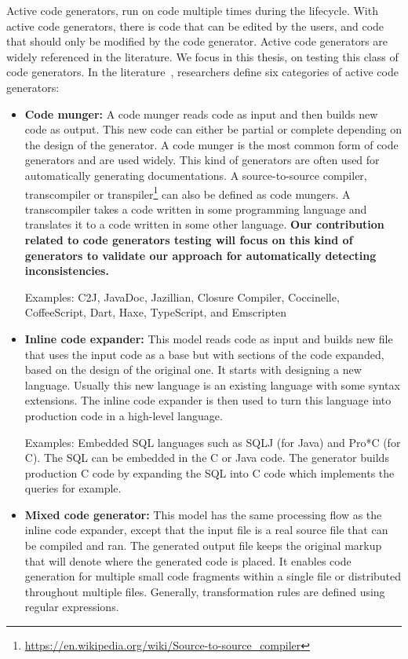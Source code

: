 Active code generators, run on code multiple times during the lifecycle. With active code generators, there is code that can be edited by the users, and code that should only be modified by the code generator. Active code generators are widely referenced in the literature\cite{pais2005tool,amanquah2009rapid}. We focus in this thesis, on testing this class of code generators.
In the literature~\cite{herrington2003code,hunt2000pragmatic,fertalj2008source,bajovs2013code}, researchers define six categories of active code generators: 

\begin{itemize}
\item \textbf{Code munger:} A code munger reads code as input and then builds new code as output. This new code can either be partial or complete depending on the design of the generator.
A code munger is the most common form of code generators and are used widely. This kind of generators are often used for automatically generating documentations.
A source-to-source compiler, transcompiler or transpiler\footnote{\url{https://en.wikipedia.org/wiki/Source-to-source_compiler}} can also be defined as code mungers. A transcompiler takes a code written in some programming language and translates it to a code written in some other language. \textbf{Our contribution related to code generators testing will focus on this kind of generators to validate our approach for automatically detecting inconsistencies.}

Examples:  C2J, JavaDoc, Jazillian, Closure Compiler, Coccinelle, CoffeeScript, Dart, Haxe, TypeScript, and Emscripten



\item \textbf{Inline code expander:} This model reads code as input and builds new file that uses the input code as a base but with sections of the code expanded, based on the design of the original one. 
It starts with designing a new language. Usually this new language is an existing language with some syntax extensions. The inline code expander is then used to turn this language into production code in a high-level language.

Examples: Embedded SQL languages such as SQLJ (for Java) and Pro*C (for C). The SQL can be embedded in the C or Java code. The generator builds production C code by expanding the SQL into C code which implements the queries for example.

\item \textbf{Mixed code generator:} This model has the same processing flow as the inline code expander, except that the input file is a real source file that can be compiled and ran. The generated output file keeps the original markup that will denote where the generated code is placed. It enables code generation for multiple small code fragments within a single file or distributed throughout multiple files. Generally, transformation rules are defined using regular expressions.



\end{itemize}
